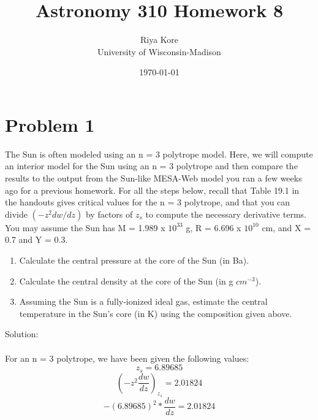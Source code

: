 \documentclass[10pt]{article}
\def \MYID{Riya Kore}
\begin{document}
\pagestyle{fancy}
\fancyhf{}
\fancyfoot[C]{\thepage}

\title{Astronomy 310 Homework 8}
\author{\MYID\\
University of Wisconsin-Madison}
\date{\today}
\maketitle

\section*{Problem 1}
The Sun is often modeled using an n = 3 polytrope model. Here, we will compute an interior model for the Sun using an n = 3 polytrope and then compare the results to the output from the Sun-like MESA-Web model you ran a few weeks ago for a previous homework. For all the steps below, recall that Table 19.1 in the handouts gives critical values for the n = 3 polytrope, and that you can divide $(- z^{2} dw/dz)$ by factors of $z_{s}$ to compute the necessary derivative terms. You may assume the Sun has M = 1.989 x $10^{33}$ g, R = 6.696 x $10^{10}$ cm, and X = 0.7 and Y = 0.3.

\begin{enumerate}[label=(\alph*)]

\item Calculate the central pressure at the core of the Sun (in Ba).


\item Calculate the central density at the core of the Sun (in g $cm^{-3}$).

\item Assuming the Sun is a fully-ionized ideal gas, estimate the central temperature in the Sun's core (in K) using the composition given above.

\end{enumerate}
Solution:\\ \\
For an n = 3 polytrope, we have been given the following values:\\
\begin{equation}
    z_{s} = 6.89685
\end{equation}
\[ \left( -z^{2} \frac{dw}{dz}\right)_{z_{s}} = 2.01824 \]
\[ -(6.89685)^{2} * \frac{dw}{dz} = 2.01824\]
\end{document}
